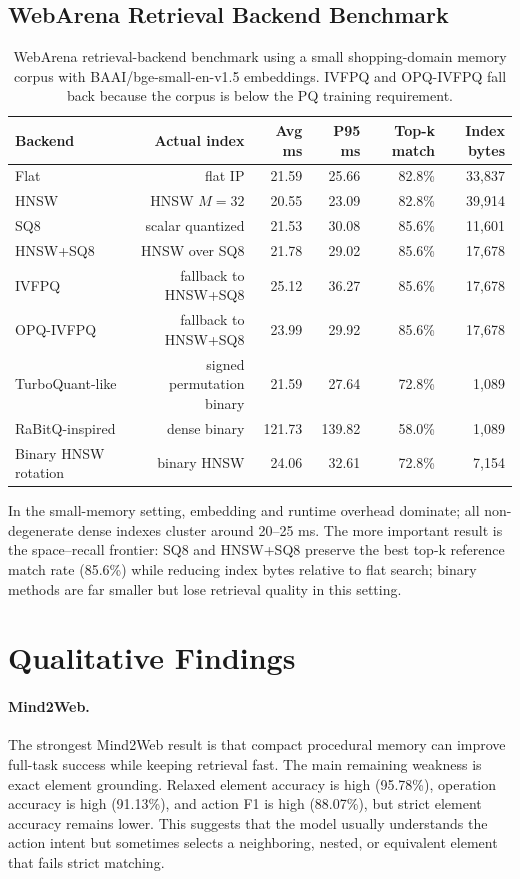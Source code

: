 \documentclass[11pt]{article}
\begin{document}
\subsection{WebArena Retrieval Backend Benchmark}

\begin{table}[h]
\centering
\scriptsize
\begin{tabular}{lrrrrr}
\toprule
\textbf{Backend} & \textbf{Actual index} & \textbf{Avg ms} & \textbf{P95 ms} & \textbf{Top-k match} & \textbf{Index bytes} \\
\midrule
Flat & flat IP & 21.59 & 25.66 & 82.8\% & 33,837 \\
HNSW & HNSW $M=32$ & 20.55 & 23.09 & 82.8\% & 39,914 \\
SQ8 & scalar quantized & 21.53 & 30.08 & 85.6\% & 11,601 \\
HNSW+SQ8 & HNSW over SQ8 & 21.78 & 29.02 & 85.6\% & 17,678 \\
IVFPQ & fallback to HNSW+SQ8 & 25.12 & 36.27 & 85.6\% & 17,678 \\
OPQ-IVFPQ & fallback to HNSW+SQ8 & 23.99 & 29.92 & 85.6\% & 17,678 \\
TurboQuant-like & signed permutation binary & 21.59 & 27.64 & 72.8\% & 1,089 \\
RaBitQ-inspired & dense binary & 121.73 & 139.82 & 58.0\% & 1,089 \\
Binary HNSW rotation & binary HNSW & 24.06 & 32.61 & 72.8\% & 7,154 \\
\bottomrule
\end{tabular}
\caption{WebArena retrieval-backend benchmark using a small shopping-domain memory corpus with BAAI/bge-small-en-v1.5 embeddings. IVFPQ and OPQ-IVFPQ fall back because the corpus is below the PQ training requirement.}
\label{tab:webarena_backend}
\end{table}

In the small-memory setting, embedding and runtime overhead dominate; all non-degenerate dense indexes cluster around 20--25 ms. The more important result is the space--recall frontier: SQ8 and HNSW+SQ8 preserve the best top-k reference match rate (85.6\%) while reducing index bytes relative to flat search; binary methods are far smaller but lose retrieval quality in this setting.

\section{Qualitative Findings}

\paragraph{Mind2Web.}
The strongest Mind2Web result is that compact procedural memory can improve full-task success while keeping retrieval fast. The main remaining weakness is exact element grounding. Relaxed element accuracy is high (95.78\%), operation accuracy is high (91.13\%), and action F1 is high (88.07\%), but strict element accuracy remains lower. This suggests that the model usually understands the action intent but sometimes selects a neighboring, nested, or equivalent element that fails strict matching.
\end{document}

